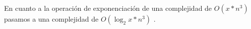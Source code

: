 En cuanto a la operación de exponenciación de una complejidad de $O(x*n^3)$ pasamos a una complejidad de $O(\log_{2}x*n^3)$ .